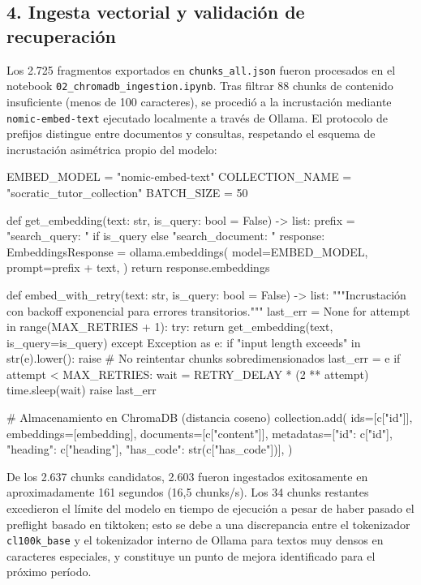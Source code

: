 \documentclass[12pt]{article}
\begin{document}
\subsection*{4. Ingesta vectorial y validación de recuperación}

Los 2.725 fragmentos exportados en \texttt{chunks\_all.json} fueron procesados
en el notebook \texttt{02\_chromadb\_ingestion.ipynb}. Tras filtrar 88 chunks
de contenido insuficiente (menos de 100 caracteres), se procedió a la
incrustación mediante \texttt{nomic-embed-text} ejecutado localmente a través
de Ollama. El protocolo de prefijos distingue entre documentos y consultas,
respetando el esquema de incrustación asimétrica propio del modelo:

\begin{python}
EMBED_MODEL     = "nomic-embed-text"
COLLECTION_NAME = "socratic_tutor_collection"
BATCH_SIZE      = 50

def get_embedding(text: str, is_query: bool = False) -> list:
    prefix = "search_query: " if is_query else "search_document: "
    response: EmbeddingsResponse = ollama.embeddings(
        model=EMBED_MODEL,
        prompt=prefix + text,
    )
    return response.embeddings

def embed_with_retry(text: str, is_query: bool = False) -> list:
    """Incrustación con backoff exponencial para errores transitorios."""
    last_err = None
    for attempt in range(MAX_RETRIES + 1):
        try:
            return get_embedding(text, is_query=is_query)
        except Exception as e:
            if "input length exceeds" in str(e).lower():
                raise  # No reintentar chunks sobredimensionados
            last_err = e
            if attempt < MAX_RETRIES:
                wait = RETRY_DELAY * (2 ** attempt)
                time.sleep(wait)
    raise last_err

# Almacenamiento en ChromaDB (distancia coseno)
collection.add(
    ids=[c["id"]],
    embeddings=[embedding],
    documents=[c["content"]],
    metadatas=[{"id": c["id"], "heading": c["heading"],
                "has_code": str(c["has_code"])}],
)
\end{python}

De los 2.637 chunks candidatos, 2.603 fueron ingestados exitosamente en
aproximadamente 161 segundos (16,5 chunks/s). Los 34 chunks restantes excedieron
el límite del modelo en tiempo de ejecución a pesar de haber pasado el
preflight basado en tiktoken; esto se debe a una discrepancia entre el
tokenizador \texttt{cl100k\_base} y el tokenizador interno de Ollama para
textos muy densos en caracteres especiales, y constituye un punto de mejora
identificado para el próximo período.
\end{document}
